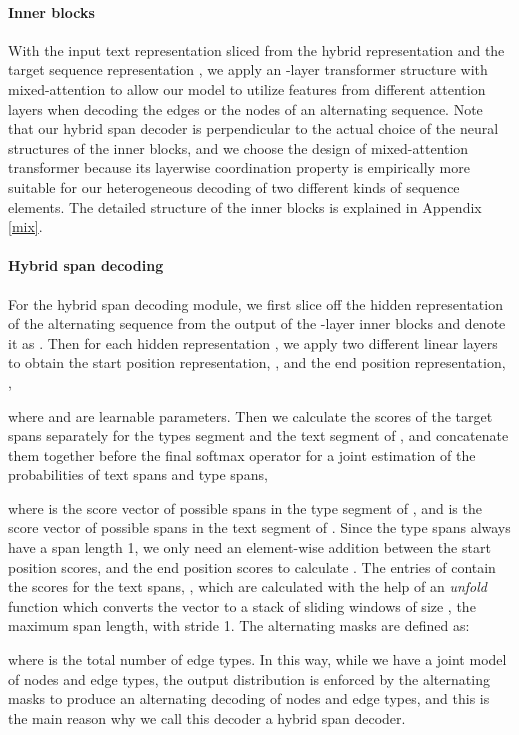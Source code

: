 \documentclass[11pt,a4paper]{article}
\begin{document}
\paragraph{Inner blocks}

With the input text representation  sliced from the hybrid representation  and the target sequence representation , we apply an -layer transformer structure with mixed-attention \cite{layerwise} to allow our model to utilize features from different attention layers when decoding the edges or the nodes of an alternating sequence. Note that our hybrid span decoder is perpendicular to the actual choice of the neural structures of the inner blocks, and we choose the design of mixed-attention transformer \cite{layerwise} because its layerwise coordination property is empirically more suitable for our heterogeneous decoding of two different kinds of sequence elements. The detailed structure of the inner blocks is explained in Appendix \ref{mix}.


\paragraph{Hybrid span decoding}

For the hybrid span decoding module, we first slice off the hidden representation of the alternating sequence  from the output of the -layer inner blocks and denote it as .
Then for each hidden representation , we apply two different linear layers to obtain the start position representation, , and the end position representation, ,

where  and  are learnable parameters.
Then we  calculate the scores of the target spans separately for the types segment and the text segment of , and concatenate them together before the final softmax operator for a joint estimation of the probabilities of text spans and type spans,
 
where 
 is the score vector of possible spans in the type segment of , and  is the score vector of possible spans in the text segment of . Since the type spans always have a span length 1, we only need an element-wise addition between the start position scores,  and the end position scores  to calculate . The entries of  contain the scores for the text spans, , which are calculated with the help of an \emph{unfold} function which converts the vector  to a stack of  sliding windows of size , the maximum span length, with stride 1. The alternating masks  are defined as:

 where  is the total number of  edge types.  In this way, while we have a joint model of  nodes and edge types, the output distribution is enforced by the alternating masks to produce an alternating decoding of  nodes and  edge types, and this is the main reason why we call this decoder a hybrid span decoder.
\end{document}
